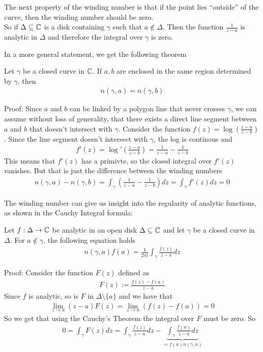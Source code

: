 The next property of the winding number is that if the point lies ``outside'' of the curve, then the winding number should be zero.\\
So if $\Delta \subseteq \mathbb{C}$ is a disk containing $\gamma$ such that $a \notin \Delta$. Then the function $\frac{1}{z-a}$ is analytic in $\Delta$ and therefore the integral over $\gamma$ is zero.

In a more general statement, we get the following theorem
\begin{theorem}[]
	Let $\gamma$ be a closed curve in $\mathbb{C}$. If $a,b$ are enclosed in the same region determined by $\gamma$, then
	\begin{align*}
		n(\gamma,a) = n(\gamma,b)
	\end{align*}
\end{theorem}

Proof: Since $a$ and $b$ can be linked by a polygon line that never crosses $\gamma$, we can assume without loss of generality, that there exists a direct line segment between $a$ and $b$ that doesn't intersect with $\gamma$.
Consider the function $f(z) = \log\left(\frac{z-a}{z-b}\right)$. Since the line segment doesn't intersect with $\gamma$, the log is continous and
\begin{align*}
	f'(z) = \log'\left(\frac{z-a}{z-b}\right) = \frac{1}{z-a} - \frac{1}{z-b}
\end{align*}
This means that $f'(z)$ has a primivte, so the closed integral over $f'(z)$ vanishes. But that is just the difference between the winding numbers
\begin{align*}
	n(\gamma,a) - n(\gamma,b) =  \int_{\gamma} \left(\frac{1}{z-a} - \frac{1}{z-b}\right) dz = \int_{\gamma}f'(z) dz = 0
\end{align*}


The winding number can give us insight into the regularity of analytic functions, as shown in the Cauchy Integral formula:
\begin{theorem}[]
	Let $f: \Delta \to \mathbb{C}$ be analytic in an open disk $\Delta\subseteq \mathbb{C}$ and let $\gamma$ be a closed curve in $\Delta$. For $a \notin \gamma$, the following equation holds
	\begin{align*}
		n(\gamma,a) f(a) = \frac{1}{2\pi i} \int_{\gamma} \frac{f(z)}{z- a}dz
	\end{align*}
\end{theorem}
Proof: Consider the function $F(z)$ defined as
\begin{align*}
	F(z) := \frac{f(z) - f(a)}{z-a}
\end{align*}
Since $f$ is analytic, so is $F$ in $\Delta \setminus \{a\}$ and we have that
\begin{align*}
	\lim_{z \to a} (z-a) F(z) = \lim_{z \to a} \left(f(z) - f(a)\right) = 0
\end{align*}
So we get that using the Cauchy's Theorem the integral over $F$ must be zero. So 
\begin{align*}
	0 = \int_{\gamma}F(z) dz = \int_{\gamma} \frac{f(z)}{z-a}dz - \underbrace{\int_{\gamma} \frac{f(a)}{z-a} dz}_{= f(a) n(\gamma,a)}
\end{align*}

